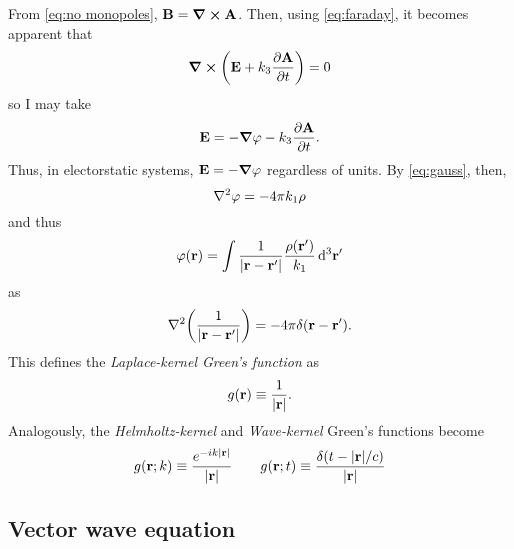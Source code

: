 From \cref{eq:no monopoles}, $\vb{B} = \curl{\vb{A}}$. 
Then, using \cref{eq:faraday}, it becomes apparent that
\begin{equation*}
  \curl{\qty(\vb{E} + k_3 \pdv{\vb{A}}{t})} = 0
\end{equation*}
so I may take
\begin{equation*}
  \vb{E} = -\grad{\varphi} - k_3 \pdv{\vb{A}}{t}.
\end{equation*}
Thus, in electorstatic systems, $\vb{E} = -\grad{\varphi}$ regardless of units.
By \cref{eq:gauss}, then,
\begin{equation*}
  \laplacian \varphi = -4 \pi k_1 \rho
\end{equation*}
and thus
\begin{equation*}
  \varphi(\vb{r}) = \int \frac{1}{\abs{\vb{r} - \vb{r}'}} \frac{\rho(\vb{r}')}{k_1} \dd[3]{\vb{r}'}
\end{equation*}
as
\begin{equation*}
  \laplacian \qty(\frac{1}{\abs{\vb{r} - \vb{r}'}}) = -4 \pi \delta(\vb{r} - \vb{r}').
\end{equation*}
This defines the \emph{Laplace-kernel Green's function} as
\begin{equation}
  g(\vb{r}) \equiv \frac{1}{\abs{\vb{r}}}.
  \label{eq:scalar green}
\end{equation}
Analogously, the \emph{Helmholtz-kernel} and \emph{Wave-kernel} Green's functions become
\begin{equation}
  g(\vb{r}; k) \equiv \frac{e^{-i k \abs{\vb{r}}}}{\abs{\vb{r}}} \qquad
  g(\vb{r}; t) \equiv \frac{\delta(t - \abs{\vb{r}}/c)}{\abs{\vb{r}}}
\end{equation}

\subsection{Vector wave equation}


